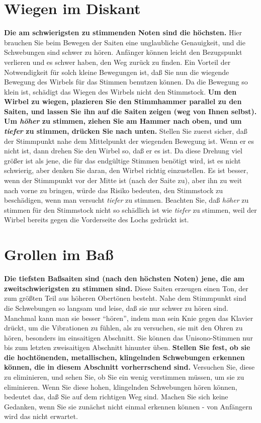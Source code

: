 \section{Wiegen im Diskant}\hypertarget{c2_5_disk}{}

\textbf{Die am schwierigsten zu stimmenden Noten sind die höchsten.}
Hier brauchen Sie beim Bewegen der Saiten eine unglaubliche Genauigkeit, und die Schwebungen sind schwer zu hören.
Anfänger können leicht den Bezugspunkt verlieren und es schwer haben, den Weg zurück zu finden.
Ein Vorteil der Notwendigkeit für solch kleine Bewegungen ist, daß Sie nun die wiegende Bewegung des Wirbels für das Stimmen benutzen können.
Da die Bewegung so klein ist, schädigt das Wiegen des Wirbels nicht den Stimmstock.
\textbf{Um den Wirbel zu wiegen, plazieren Sie den Stimmhammer parallel zu den Saiten, und lassen Sie ihn auf die Saiten zeigen (weg von Ihnen selbst).
Um \textit{höher} zu stimmen, ziehen Sie am Hammer nach oben, und um \textit{tiefer} zu stimmen, drücken Sie nach unten.}
Stellen Sie zuerst sicher, daß der Stimmpunkt nahe dem Mittelpunkt der wiegenden Bewegung ist.
Wenn er es nicht ist, dann drehen Sie den Wirbel so, daß er es ist.
Da diese Drehung viel größer ist als jene, die für das endgültige Stimmen benötigt wird, ist es nicht schwierig, aber denken Sie daran, den Wirbel richtig einzustellen.
Es ist besser, wenn der Stimmpunkt vor der Mitte ist (nach der Saite zu), aber ihn zu weit nach vorne zu bringen, würde das Risiko bedeuten, den Stimmstock zu beschädigen, wenn man versucht \textit{tiefer} zu stimmen.
Beachten Sie, daß \textit{höher} zu stimmen für den Stimmstock nicht so schädlich ist wie \textit{tiefer} zu stimmen, weil der Wirbel bereits gegen die Vorderseite des Lochs gedrückt ist.
 

\hypertarget{c2_5i}{}
\section{Grollen im Baß}\hypertarget{c2_5_bass}{}

\textbf{Die tiefsten Baßsaiten sind (nach den höchsten Noten) jene, die am zweitschwierigsten zu stimmen sind.}
Diese Saiten erzeugen einen Ton, der zum größten Teil aus höheren Obertönen besteht.
Nahe dem Stimmpunkt sind die Schwebungen so langsam und leise, daß sie nur schwer zu hören sind.
Manchmal kann man sie besser \enquote{hören}, indem man sein Knie gegen das Klavier drückt, um die Vibrationen zu fühlen, als zu versuchen, sie mit den Ohren zu hören, besonders im einsaitigen Abschnitt.
Sie können das Unisono-Stimmen nur bis zum letzten zweisaitigen Abschnitt hinunter üben.
\textbf{Stellen Sie fest, ob sie die hochtönenden, metallischen, klingelnden Schwebungen erkennen können, die in diesem Abschnitt vorherrschend sind.}
Versuchen Sie, diese zu eliminieren, und sehen Sie, ob Sie ein wenig verstimmen müssen, um sie zu eliminieren.
Wenn Sie diese hohen, klingelnden Schwebungen hören können, bedeutet das, daß Sie auf dem richtigen Weg sind.
Machen Sie sich keine Gedanken, wenn Sie sie zunächst nicht einmal erkennen können - von Anfängern wird das nicht erwartet.
 

